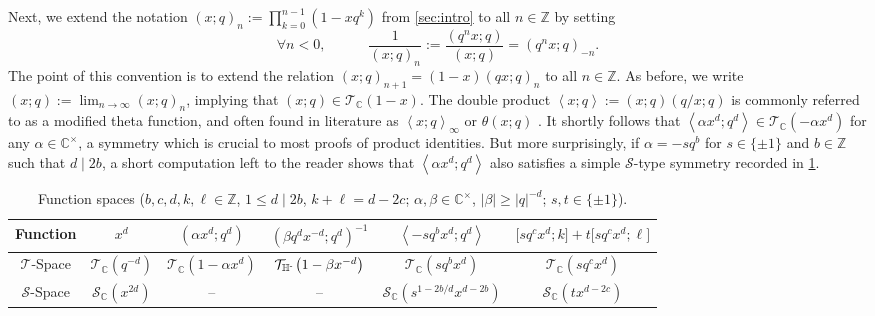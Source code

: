 \documentclass[reqno,11pt]{amsart}
\theoremstyle{definition}
\theoremstyle{remark}
\numberwithin{equation}{section}
\renewcommand{\arraystretch}{1.2}
\newcommand{\Z}{\mathbb{Z}}
\newcommand{\C}{\mathbb{C}}
\newcommand{\Hminus}{{\mathbb{H}^{\textnormal{-}\hspace{-0.03cm}}}}
\newcommand{\mT}{\mathcal{T}}
\newcommand{\mS}{\mathcal{S}}
\newcommand{\la}{\left\langle}
\newcommand{\ra}{\right\rangle}
\newcommand{\vect}[2]{\big[{#1};{#2}\big]}
\begin{document}
Next, we extend the notation $(x; q)_n := \prod_{k=0}^{n-1} \left(1 - xq^k\right)$ from \cref{sec:intro} to all $n \in \Z$ by setting
\begin{equation} \label{eq:finite-product-negative}
    \forall n < 0, \qquad\quad \frac{1}{(x; q)_n} := \frac{(q^n x; q)}{\left(x; q\right)}
    =
    \left(q^n x; q\right)_{-n}.
\end{equation}
The point of this convention is to extend the relation $(x; q)_{n+1} = (1-x)(qx; q)_n$ to all $n \in \Z$. As before, we write $(x; q) := \lim_{n \to \infty} (x; q)_n$, implying that $(x; q) \in \mT_\C(1-x)$. The double product $\la x; q\ra := (x; q) (q/x; q)$ is commonly referred to as a modified theta function, and often found in literature as $\la x; q \ra_\infty$ \cite{chu2007unification} or $\theta(x; q)$ \cite[(11.2.1)]{gasper2004basic}. It shortly follows that $\la \alpha x^d; q^d \ra \in \mT_\C\left(-\alpha x^d\right)$ for any $\alpha \in \C^\times$, a symmetry which is crucial to most proofs of product identities. But more surprisingly, if $\alpha = -sq^b$ for $s \in \{\pm 1\}$ and $b \in \Z$ such that $d \mid 2b$, a short computation left to the reader shows that $\la \alpha x^d; q^d \ra$ also satisfies a simple $\mS$-type symmetry recorded in \cref{tbl:spaces}.
\begin{table}[ht]
\captionsetup{width=\linewidth}
\centering
\renewcommand{\arraystretch}{1.5}
\begin{tabular}{c|c|c|c|c|c}
Function
& $x^d$ 
& $\left(\alpha x^{d}; q^d\right)$ 
& $\left(\beta q^d x^{-d}; q^d\right)^{-1}$ 
& $\la -sq^b x^d; q^d \ra$
& $\vect{sq^cx^d}{k} + t\vect{sq^cx^d}{\ell}$ %
\\\hline
$\mT$-Space 
& $\mT_\C\left(q^{-d} \right)$
& $\mT_\C\left(1 - \alpha x^d\right)$
& $\mT_\Hminus\left(1 - \beta x^{-d}\right)$
& $\mT_\C\left(sq^bx^d \right)$
& $\mT_\C\left(sq^cx^d\right)$ 
\\\hline
$\mS$-Space 
& $\mS_\C\left(x^{2d} \right)$
& --
& --
& $\mS_\C\left(s^{1-2b/d} x^{d-2b} \right)$
& $\mS_\C\left(t x^{d-2c}\right)$
\end{tabular}
\caption{Function spaces ($b, c, d, k, \ell \in \Z$, $1 \le d \mid 2b$, $k + \ell = d - 2c$; $\alpha, \beta \in \C^\times$, $|\beta| \ge |q|^{-d}$; $s, t \in \{\pm 1\}$).}
\label{tbl:spaces}
\end{table}
\end{document}

